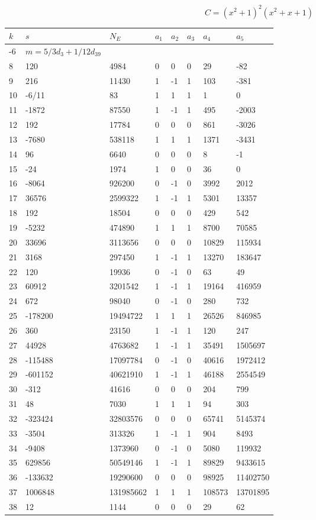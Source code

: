 \documentclass{amsart}
\begin{document}
$$C=(x^2
 + 1)^{2}(x^2
 + x
 + 1)$$
\begin{longtable}{|l|l|l|lllll|}
\hline
$k$ & $s$ & $N_E$ & $a_1$ & $a_2$ & $a_3$ & $a_4$ & $a_5$\\
\hline
-6&$m=5/3d_{3}+1/12d_{39}$&&\multicolumn{5}{c|}{}\\
8&120&4984&0&0&0&29&-82\\
9&216&11430&1&-1&1&103&-381\\
10&-6/11&83&1&1&1&1&0\\
11&-1872&87550&1&-1&1&495&-2003\\
12&192&17784&0&0&0&861&-3026\\
13&-7680&538118&1&1&1&1371&-3431\\
14&96&6640&0&0&0&8&-1\\
15&-24&1974&1&0&0&36&0\\
16&-8064&926200&0&-1&0&3992&2012\\
17&36576&2599322&1&-1&1&5301&13357\\
18&192&18504&0&0&0&429&542\\
19&-5232&474890&1&1&1&8700&70585\\
20&33696&3113656&0&0&0&10829&115934\\
21&3168&297450&1&-1&1&13270&183647\\
22&120&19936&0&-1&0&63&49\\
23&60912&3201542&1&-1&1&19164&416959\\
24&672&98040&0&-1&0&280&732\\
25&-178200&19494722&1&1&1&26526&846985\\
26&360&23150&1&-1&1&120&247\\
27&44928&4763682&1&-1&1&35491&1505697\\
28&-115488&17097784&0&-1&0&40616&1972412\\
29&-601152&40621910&1&-1&1&46188&2554549\\
30&-312&41616&0&0&0&204&799\\
31&48&7030&1&1&1&94&303\\
32&-323424&32803576&0&0&0&65741&5145374\\
33&-3504&313326&1&-1&1&904&8493\\
34&-9408&1373960&0&-1&0&5080&119932\\
35&629856&50549146&1&-1&1&89829&9433615\\
36&-133632&19290600&0&0&0&98925&11402750\\
37&1006848&131985662&1&1&1&108573&13701895\\
38&12&1144&0&0&0&29&62\\

\end{longtable}
\end{document}
